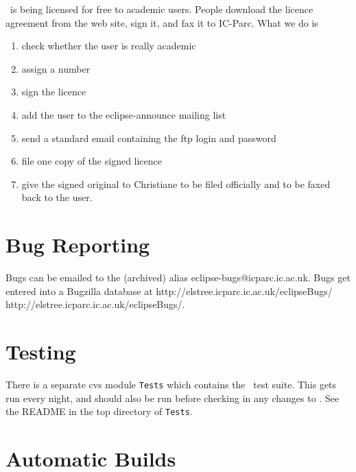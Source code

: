 \eclipse\ is being licensed for free to academic users.
People download the licence agreement from the web site, sign it,
and fax it to IC-Parc. What we do is
\begin{enumerate}
\item check whether the user is really academic
\item assign a number
\item sign the licence
\item add the user to the eclipse-announce mailing list
\item send a standard email containing the ftp login and password
\item file one copy of the signed licence
\item give the signed original to Christiane to be filed officially
        and to be faxed back to the user.
\end{enumerate}


\section{Bug Reporting}

Bugs can be emailed to the (archived) alias eclipse-bugs@icparc.ic.ac.uk.
Bugs get entered into a Bugzilla database at
http://elstree.icparc.ic.ac.uk/eclipseBugs/
{http://elstree.icparc.ic.ac.uk/eclipseBugs/}.

\section{Testing}

There is a separate cvs module {\tt Tests} which contains the
\eclipse\ test suite. This gets run every night, and should also
be run before checking in any changes to \eclipse.
See the README in the top directory of {\tt Tests}.


\section{Automatic Builds}

